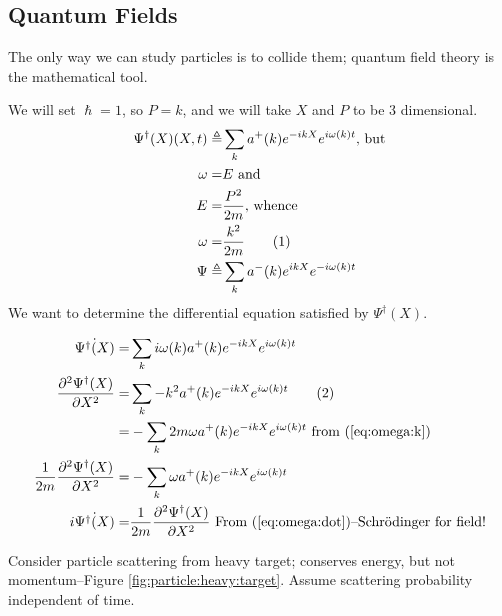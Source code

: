 \documentclass[]{article}
\newcommand\numberthis{\addtocounter{equation}{1}\tag{\theequation}}
\begin{document}
\subsection{Quantum Fields}

The only way we can study particles is to collide them; quantum field theory is the mathematical tool.

We will set $\hslash=1$, so $P=k$, and we will take $X$ and $P$ to be 3 dimensional.
\begin{align*}
\Psi^\dagger(X)(X,t) \triangleq& \sum_k a^+(k) e^{-ikX} e^{i \omega(k) t} \text{, but}\\
\omega =& E \text{ and}\\
E =& \frac{P^2}{2m} \text{, whence}\\
\omega =& \frac{k^2}{2m} \numberthis \label{eq:omega:k}\\
\Psi \triangleq& \sum_k a^-(k) e^{ikX} e^{- i \omega(k) t}
\end{align*}
We want to determine the differential equation satisfied by $\Psi^\dagger(X)$.

\begin{align*}
\dot{\Psi^\dagger(X)} =&  \sum_k i \omega(k) a^+(k) e^{-ikX} e^{i \omega(k) t}\\
\frac{\partial^2 \Psi^\dagger(X)}{\partial X^2} =& \sum_k -k^2 a^+(k) e^{-ikX} e^{i \omega(k) t} \numberthis \label{eq:omega:dot}\\
 =& - \sum_k 2m \omega a^+(k) e^{-ikX} e^{i \omega(k) t} \text{ from (\ref{eq:omega:k})}\\
 \frac{1}{2m} \frac{\partial^2 \Psi^\dagger(X)}{\partial X^2} =& - \sum_k \omega a^+(k) e^{-ikX} e^{i \omega(k) t}\\
  i \dot{\Psi^\dagger(X)} =&  \frac{1}{2m} \frac{\partial^2 \Psi^\dagger(X)}{\partial X^2} \text{ From (\ref{eq:omega:dot})--Schr\"odinger for field!}
\end{align*}

Consider particle scattering from heavy target; conserves energy, but not momentum--Figure \ref{fig:particle:heavy:target}. Assume scattering probability independent of time.
\end{document}
